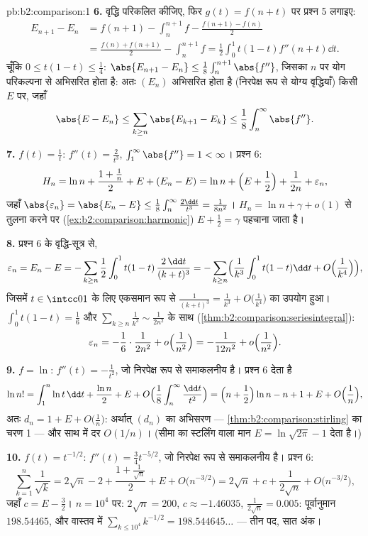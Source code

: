 \begin{solution}{pb:b2:comparison:1}
\textbf{6.} वृद्धि परिकलित कीजिए, फिर $g(t) = f(n + t)$ पर प्रश्न 5 लगाइए:
\begin{align*}
E_{n+1} - E_n
&= f(n{+}1) - \int_n^{n+1}\!f - \frac{f(n{+}1) - f(n)}2 \\
&= \frac{f(n) + f(n{+}1)}2 - \int_n^{n+1}\!f
= \frac12\int_0^1 t(1-t)f''(n+t)\dd t .
\end{align*}
चूँकि $0 \leq t(1-t) \leq \frac14$: $\abs{E_{n+1} - E_n} \leq
\frac18\int_n^{n+1}\abs{f''}$, जिसका $n$ पर योग परिकल्पना से अभिसरित होता है: अतः $(E_n)$
अभिसरित होता है (निरपेक्ष रूप से योग्य वृद्धियाँ) किसी $E$ पर, जहाँ
\[
\abs{E - E_n} \leq \sum_{k\geq n}\abs{E_{k+1} - E_k} \leq
\frac18\int_n^\infty\abs{f''} .
\]

\textbf{7.} $f(t) = \frac1t$: $f''(t) = \frac2{t^3}$, $\int_1^\infty\abs{f''} = 1 < \infty$। प्रश्न 6:
\[
H_n = \ln n + \frac{1 + \frac1n}{2} + E + (E_n - E)
= \ln n + \Bigl(E + \frac12\Bigr) + \frac1{2n} +
\varepsilon_n,
\]
जहाँ $\abs{\varepsilon_n} = \abs{E_n - E} \leq
\frac18\int_n^\infty\frac{2\dd t}{t^3} = \frac1{8n^2}$। $H_n = \ln n + \gamma + o(1)$ से तुलना करने पर (\cref{ex:b2:comparison:harmonic}) $E + \frac12 =
\gamma$ पहचाना जाता है।

\textbf{8.} प्रश्न 6 के वृद्धि-सूत्र से,
\[
\varepsilon_n = E_n - E = -\sum_{k\geq n}\frac12\int_0^1
t(1-t)\,\frac{2\,\dd t}{(k+t)^3}
= -\sum_{k \geq n}\Bigl(\frac1{k^3}\int_0^1t(1-t)\dd t +
O\Bigl(\frac1{k^4}\Bigr)\Bigr),
\]
जिसमें $t \in \intcc01$ के लिए एकसमान रूप से $\frac{1}{(k+t)^3} = \frac1{k^3} +
O\bigl(\frac1{k^4}\bigr)$ का उपयोग हुआ। $\int_0^1 t(1-t) = \frac16$ और
$\sum_{k\geq n}\frac1{k^3} \sim \frac{1}{2n^2}$
के साथ (\cref{thm:b2:comparison:seriesintegral}):
\[
\varepsilon_n = -\frac16\cdot\frac{1}{2n^2} +
o\Bigl(\frac1{n^2}\Bigr) = -\frac{1}{12n^2} +
o\Bigl(\frac{1}{n^2}\Bigr).
\]

\textbf{9.} $f = \ln$: $f''(t) = -\frac1{t^2}$, जो निरपेक्ष रूप से समाकलनीय है। प्रश्न 6 देता है
\[
\ln n! = \int_1^n\ln t\,\dd t + \frac{\ln n}2 + E + O\Bigl(
\frac1{8}\int_n^\infty\frac{\dd t}{t^2}\Bigr)
= \Bigl(n + \frac12\Bigr)\ln n - n + 1 + E +
O\Bigl(\frac1n\Bigr),
\]
अतः $d_n = 1 + E + O\bigl(\frac1n\bigr)$: अर्थात् $(d_n)$ का अभिसरण --- \cref{thm:b2:comparison:stirling} का चरण 1 --- और साथ में दर $O(1/n)$।
(सीमा का स्टर्लिंग वाला मान $E =
\ln\sqrt{2\pi} - 1$ देता है।)

\textbf{10.} $f(t) = t^{-1/2}$: $f''(t) = \frac34 t^{-5/2}$, जो निरपेक्ष रूप से समाकलनीय है। प्रश्न 6:
\[
\sum_{k=1}^n \frac1{\sqrt k}
= 2\sqrt n - 2 + \frac{1 + \frac1{\sqrt n}}2 + E +
O\bigl(n^{-3/2}\bigr)
= 2\sqrt n + c + \frac{1}{2\sqrt n} +
O\bigl(n^{-3/2}\bigr),
\]
जहाँ $c = E - \frac32$। $n = 10^4$ पर: $2\sqrt n = 200$, $c
\approx -1.46035$, $\frac1{2\sqrt n} = 0.005$: पूर्वानुमान $198.54465$, और वास्तव में $\sum_{k\leq10^4}k^{-1/2} =
198.544645\dots$ ---
तीन पद, सात अंक।


\end{solution}
